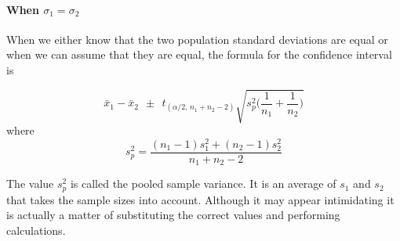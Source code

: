






\paragraph{When $\sigma_{1} = \sigma_{2}$}

When we either know that the two population standard deviations are equal or when we can
assume that they are equal, the formula for the confidence interval is

\begin{termBox}{
\begin{equation}
\bar{x}_{1} - \bar{x}_{2}	~~ \pm ~~		t_{(\alpha / 2, \, n_1+n_2-2)}  
\sqrt{ s_{p}^{2} \bigg( \frac{1}{n_{1}} + \frac{1}{n_{2}} \bigg)}\label{eqnCIDiffMeanSigmasNotKnownAndEqual}
\end{equation}
where
\begin{equation}
s_{p}^{2} = \frac{ (n_{1}-1)s_{1}^{2} + (n_{2}-1)s_{2}^{2} }{n_{1} + n_{2} - 2}	\label{eqnPooledVariance}
\end{equation}
}
\end{termBox}

The value $s_{p}^{2}$ is called the pooled sample variance.
It is an average of $s_{1}$ and $s_{2}$ that takes the sample sizes into account.
Although it may appear intimidating it is actually a matter of substituting the correct values
and performing calculations.



